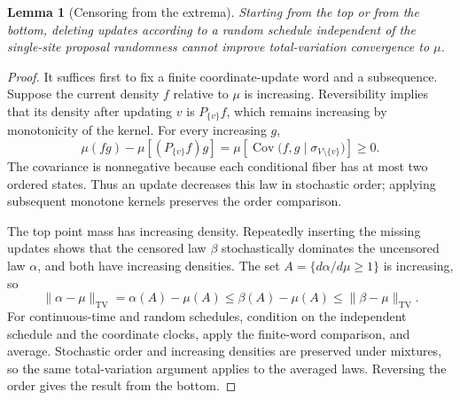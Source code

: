 \documentclass[11pt,reqno]{amsart}
\newtheorem{lemma}[theorem]{Lemma}
\theoremstyle{remark}
\newcommand{\TV}{\mathrm{TV}}
\DeclareMathOperator{\Cov}{Cov}
\numberwithin{equation}{section}
\begin{document}
\begin{lemma}[Censoring from the extrema]\label{lem:censor}
Starting from the top or from the bottom, deleting updates according to a random schedule independent of the single-site proposal randomness cannot improve total-variation convergence to $\mu$.
\end{lemma}

\begin{proof}
It suffices first to fix a finite coordinate-update word and a subsequence. Suppose the current density $f$ relative to $\mu$ is increasing. Reversibility implies that its density after updating $v$ is $P_{\{v\}}f$, which remains increasing by monotonicity of the kernel. For every increasing $g$,
\[
 \mu(fg)-\mu[(P_{\{v\}}f)g]
 =\mu\!\left[\Cov\bigl(f,g\mid\sigma_{V\setminus\{v\}}\bigr)\right]\ge0.
\]
The covariance is nonnegative because each conditional fiber has at most two ordered states. Thus an update decreases this law in stochastic order; applying subsequent monotone kernels preserves the order comparison.

The top point mass has increasing density. Repeatedly inserting the missing updates shows that the censored law $\beta$ stochastically dominates the uncensored law $\alpha$, and both have increasing densities. The set $A=\{d\alpha/d\mu\ge1\}$ is increasing, so
\[
 \|\alpha-\mu\|_{\TV}=\alpha(A)-\mu(A)
 \le\beta(A)-\mu(A)\le\|\beta-\mu\|_{\TV}.
\]
For continuous-time and random schedules, condition on the independent schedule and the coordinate clocks, apply the finite-word comparison, and average. Stochastic order and increasing densities are preserved under mixtures, so the same total-variation argument applies to the averaged laws. Reversing the order gives the result from the bottom.
\end{proof}
\end{document}
